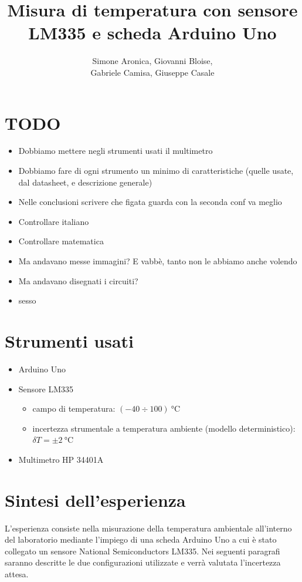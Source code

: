 \documentclass{article}
\title{Misura di temperatura con
sensore LM335 e
scheda Arduino Uno}
\author{Simone Aronica, Giovanni Bloise, \\
Gabriele Camisa, Giuseppe Casale}
\begin{document}
\maketitle
\tableofcontents
\pagebreak

\section{TODO}
\begin{itemize}
    \item Dobbiamo mettere negli strumenti usati il multimetro 
    \item Dobbiamo fare di ogni strumento un minimo di caratteristiche (quelle usate, dal datasheet, e descrizione generale)
    \item Nelle conclusioni scrivere che figata guarda con la seconda conf va meglio
    \item Controllare italiano
    \item Controllare matematica
    \item Ma andavano messe immagini? E vabbè, tanto non le abbiamo anche volendo
    \item Ma andavano disegnati i circuiti?
    \item sesso
\end{itemize}
\section{Strumenti usati}
\begin{itemize}
    \item Arduino Uno
    \item Sensore LM335
        \begin{itemize}
            \item campo di temperatura: $\left(-40\div100\right)\SI{}{\celsius}$
            \item incertezza strumentale a temperatura ambiente (modello deterministico): $\delta T= \pm\SI{2}{\celsius}$
        \end{itemize}
    \item Multimetro HP 34401A
\end{itemize}

\section{Sintesi dell'esperienza}
L'esperienza consiste nella misurazione della temperatura ambientale all'interno del laboratorio mediante l'impiego di una scheda Arduino Uno a cui è stato collegato un sensore National Semiconductors LM335. Nei seguenti paragrafi saranno descritte le due configurazioni utilizzate e verrà valutata l'incertezza attesa.
\end{document}
